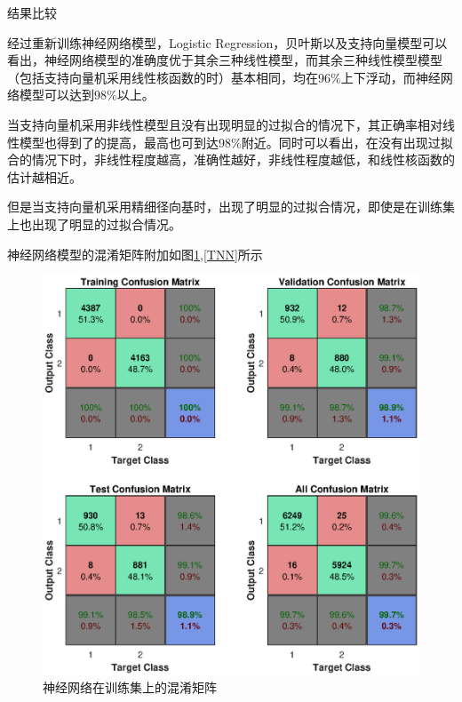 \documentclass[UTF8,a4paper]{ctexart}
\begin{document}
结果比较

经过重新训练神经网络模型，Logistic Regression，贝叶斯以及支持向量模型可以看出，神经网络模型的准确度优于其余三种线性模型，而其余三种线性模型模型（包括支持向量机采用线性核函数的时）基本相同，均在96\%上下浮动，而神经网络模型可以达到98\%以上。

当支持向量机采用非线性模型且没有出现明显的过拟合的情况下，其正确率相对线性模型也得到了的提高，最高也可到达98\%附近。同时可以看出，在没有出现过拟合的情况下时，非线性程度越高，准确性越好，非线性程度越低，和线性核函数的估计越相近。

但是当支持向量机采用精细径向基时，出现了明显的过拟合情况，即使是在训练集上也出现了明显的过拟合情况。

神经网络模型的混淆矩阵附加如图\ref{NN},\ref{TNN}所示

\begin{figure}
\centering 
\includegraphics[width=\textwidth]{NNconfi.eps}
\caption{神经网络在训练集上的混淆矩阵}
\label{NN}

\end{figure}
\end{document}
